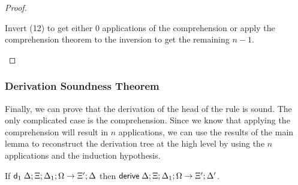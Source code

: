\begin{proof}
\begin{itemize}
      Invert (12) to get either $0$ applications of the comprehension or apply the comprehension theorem to the inversion to get the remaining $n-1$.
   \end{itemize}
\end{proof}

\subsubsection{Derivation Soundness Theorem}

Finally, we can prove that the derivation of the head of the rule is sound. The only complicated case is the comprehension. Since we know that applying the comprehension will result in $n$ applications, we can use the results of the main lemma to reconstruct the derivation tree at the high level by using the $n$ applications and the induction hypothesis.

\begin{theorem}
If $\mathsf{d}_1 \; \Delta; \Xi; \Delta_1; \Omega \rightarrow \Xi'; \Delta$ then $\mathsf{derive} \; \Delta; \Xi; \Delta_1; \Omega \rightarrow \Xi'; \Delta'$.
\end{theorem}

